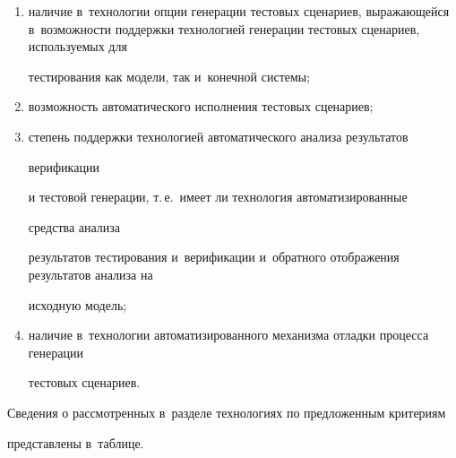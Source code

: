 \begin{enumerate}[(1)]
  \item наличие в~технологии опции генерации тестовых сценариев, выражающейся в~возможности поддержки технологией генерации тестовых сценариев, используемых для

тестирования как модели, так и~конечной системы;

  \item возможность автоматического исполнения тестовых сценариев;

  \item степень поддержки технологией автоматического анализа результатов

  верификации

и тестовой генерации, т.\,е.\ имеет ли технология автоматизированные

средства анализа

результатов тестирования и~верификации и~обратного отоб\-ра\-же\-ния результатов анализа на

исходную модель;

  \item наличие в~технологии автоматизированного механизма отладки процесса генерации

тестовых сценариев.

  \end{enumerate}



  Сведения о рассмотренных в~разделе технологиях по предложенным критериям

представлены в~таблице.



